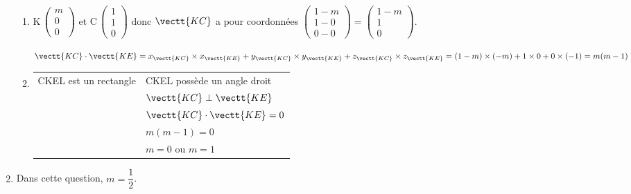 \begin{enumerate}[resume]
\begin{enumerate}
		\item%
K\,$\begin{pmatrix} m\\0\\0 \end{pmatrix}$ et
C\,$\begin{pmatrix} 1\\1\\0 \end{pmatrix}$
donc $\vectt{KC}$ a pour coordonnées
$\begin{pmatrix} 1-m\\1-0\\0-0 \end{pmatrix} = \begin{pmatrix} 1-m\\1\\0 \end{pmatrix}$.

$\vectt{KC} \cdot \vectt{KE} 
= x_{\vectt{KC}}\times x_{\vectt{KE}} + y_{\vectt{KC}}\times y_{\vectt{KE}}  + z_{\vectt{KC}}\times z_{\vectt{KE}} 
= (1-m)\times (-m) + 1 \times 0 + 0 \times (-1)
= m(m - 1)$	
		
		\item%
\begin{tabular}[t]{@{} l @{ si, et seulement si, } l}
CKEL est un rectangle & CKEL possède un angle droit\\
&$\vectt{KC} \perp \vectt{KE}$\\
& $\vectt{KC} \cdot \vectt{KE}=0$\\
& $m(m-1)=0$\\
&$m = 0$ ou $m = 1$
\end{tabular}	

\end{enumerate}
\item Dans cette question, $m = \dfrac12$. 


\end{enumerate}

